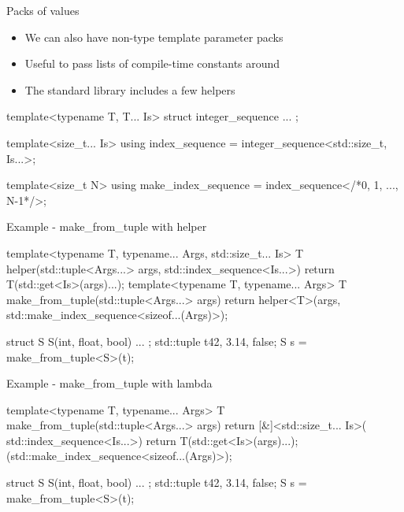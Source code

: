 \begin{frame}[fragile]
  \begin{block}{Packs of values}
    \begin{itemize}
      \item We can also have non-type template parameter packs
      \item Useful to pass lists of compile-time constants around
      \item The standard library includes a few helpers
    \end{itemize}
  \end{block}
  \begin{block}{}
    \begin{cppcode*}{}
      template<typename T, T... Is>
      struct integer_sequence { ... };

      template<size_t... Is>
      using index_sequence =
        integer_sequence<std::size_t, Is...>;

      template<size_t N>
      using make_index_sequence =
        index_sequence</*0, 1, ..., N-1*/>;
    \end{cppcode*}
  \end{block}
\end{frame}

\begin{frame}[fragile]
  \begin{exampleblock}{Example - make\_from\_tuple with helper}
    \begin{cppcode*}{}
      template<typename T,
        typename... Args, std::size_t... Is>
      T helper(std::tuple<Args...> args,
        std::index_sequence<Is...>) {
        return T(std::get<Is>(args)...);
      }
      template<typename T, typename... Args>
      T make_from_tuple(std::tuple<Args...> args) {
         return helper<T>(args,
           std::make_index_sequence<sizeof...(Args)>{});
      }

      struct S { S(int, float, bool) { ... } };
      std::tuple t{42, 3.14, false};
      S s = make_from_tuple<S>(t);
    \end{cppcode*}
  \end{exampleblock}
\end{frame}

\begin{frame}[fragile]
  \begin{exampleblock}{Example - make\_from\_tuple with lambda}
    \begin{cppcode*}{}
      template<typename T, typename... Args>
      T make_from_tuple(std::tuple<Args...> args) {
         return [&]<std::size_t... Is>(
             std::index_sequence<Is...>){
           return T(std::get<Is>(args)...);
         }(std::make_index_sequence<sizeof...(Args)>{});
      }

      struct S { S(int, float, bool) { ... } };
      std::tuple t{42, 3.14, false};
      S s = make_from_tuple<S>(t);
    \end{cppcode*}
  \end{exampleblock}
\end{frame}

